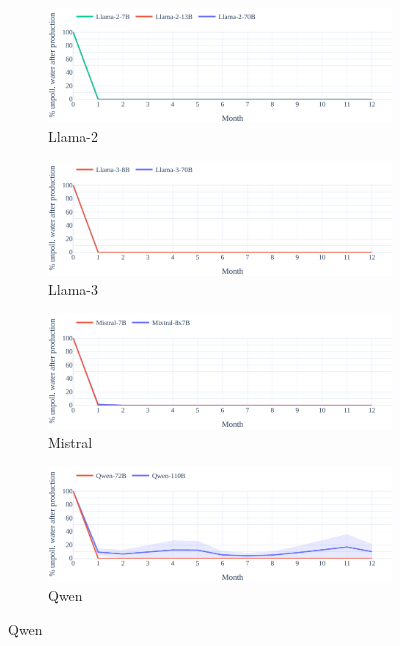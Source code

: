 \documentclass{article}
\begin{document}
\begin{figure}[h]
    \vspace{0.5em}
    \begin{subfigure}{0.49\textwidth}
            \includegraphics[width=\linewidth]{fig/pollution/pollution-baseline_concurrent-resource_over_time-Llama-2.pdf}
            \caption{Llama-2}
    \end{subfigure}
    \hspace{0.5em}
    \begin{subfigure}{0.49\textwidth}
             \includegraphics[width=\linewidth]{fig/pollution/pollution-baseline_concurrent-resource_over_time-Llama-3.pdf}
             \caption{Llama-3}
    \end{subfigure}

    \vspace{0.5em}
    \begin{subfigure}{0.49\textwidth}
            \includegraphics[width=\linewidth]{fig/pollution/pollution-baseline_concurrent-resource_over_time-Mistral.pdf}
            \caption{Mistral}
    \end{subfigure}
    \hspace{0.5em}
    \begin{subfigure}{0.49\textwidth}
             \includegraphics[width=\linewidth]{fig/pollution/pollution-baseline_concurrent-resource_over_time-Qwen.pdf}
             \caption{Qwen}
    \end{subfigure}
    

\end{figure}
\end{document}
